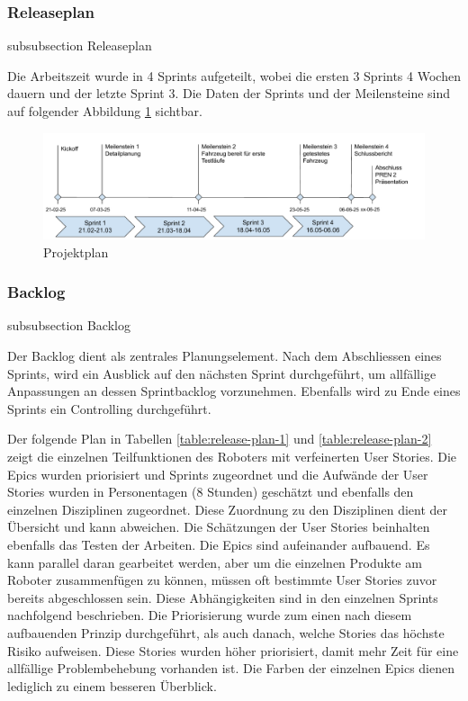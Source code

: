 \subsubsection*{Releaseplan}
    {subsubsection}
    {Releaseplan}

Die Arbeitszeit wurde in 4 Sprints aufgeteilt, wobei die ersten 3 Sprints 4 Wochen dauern und der letzte Sprint 3. Die Daten der Sprints und der Meilensteine sind auf folgender Abbildung \ref{fig:project-plan} sichtbar.


\begin{figure}[H]
\centering
\includegraphics[width=\textwidth]{assets/projektmanagement/projektplan.pdf}
\caption{Projektplan}
\label{fig:project-plan}
\end{figure}

\subsubsection*{Backlog}
    {subsubsection}
    {Backlog}
    
Der Backlog dient als zentrales Planungselement.
Nach dem Abschliessen eines Sprints, wird ein Ausblick auf den nächsten Sprint durchgeführt, um allfällige Anpassungen an dessen Sprintbacklog vorzunehmen. Ebenfalls wird zu Ende eines Sprints ein Controlling durchgeführt.

Der folgende Plan in Tabellen \ref{table:release-plan-1} und \ref{table:release-plan-2} zeigt die einzelnen Teilfunktionen des Roboters mit verfeinerten User Stories. Die Epics wurden priorisiert und Sprints zugeordnet und die Aufwände der User Stories wurden in Personentagen (8 Stunden) geschätzt und ebenfalls den einzelnen Disziplinen zugeordnet. Diese Zuordnung zu den Disziplinen dient der Übersicht und kann abweichen.
Die Schätzungen der User Stories beinhalten ebenfalls das Testen der Arbeiten. Die Epics sind aufeinander aufbauend. Es kann parallel daran gearbeitet werden, aber um die einzelnen Produkte am Roboter zusammenfügen zu können, müssen oft bestimmte User Stories zuvor bereits abgeschlossen sein. Diese Abhängigkeiten sind in den einzelnen Sprints nachfolgend beschrieben. Die Priorisierung wurde zum einen nach diesem aufbauenden Prinzip durchgeführt, als auch danach, welche Stories das höchste Risiko aufweisen. Diese Stories wurden höher priorisiert, damit mehr Zeit für eine allfällige Problembehebung vorhanden ist.
Die Farben der einzelnen Epics dienen lediglich zu einem besseren Überblick.



